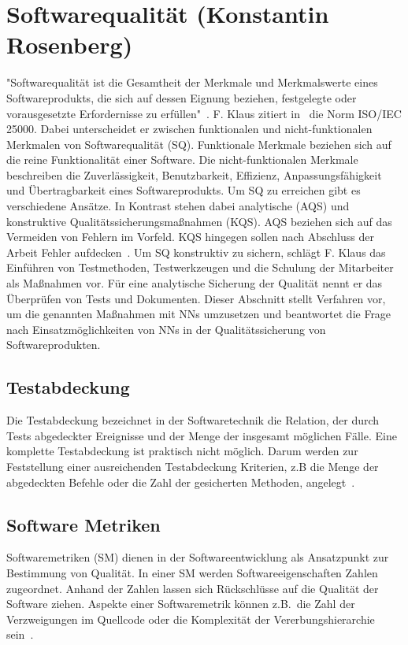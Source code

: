 \section{Softwarequalität (Konstantin Rosenberg)} \label{SQ}
"Softwarequalität ist die Gesamtheit der Merkmale und Merkmalswerte eines Softwareprodukts, die sich auf dessen Eignung beziehen,
festgelegte oder vorausgesetzte
Erfordernisse zu erfüllen"~\cite[p.~20]{Franz2015}.
F. Klaus zitiert in~\cite[p.~20]{Franz2015} die Norm ISO/IEC 25000. Dabei unterscheidet er zwischen funktionalen und nicht-funktionalen Merkmalen von Softwarequalität (SQ).
Funktionale Merkmale beziehen sich auf die reine Funktionalität einer Software. Die nicht-funktionalen Merkmale beschreiben die Zuverlässigkeit, Benutzbar\-keit, Effizienz, Anpassungsfähigkeit und Übertragbarkeit eines Softwareprodukts.
Um SQ zu erreichen gibt es verschiedene Ansätze. In Kontrast stehen dabei analytische (AQS) und konstruktive Qualitätssicherungsmaßnahmen (KQS). AQS beziehen sich auf das Vermeiden von Fehlern im Vorfeld. KQS hingegen sollen nach Abschluss der Arbeit Fehler aufdecken~\cite[p.~29]{Franz2015}. 
Um SQ konstruktiv zu sichern, schlägt F. Klaus das Einführen von Testmethoden, Testwerkzeugen und die Schulung der Mitarbeiter als Maßnahmen vor. Für eine analytische Sicherung der Qualität nennt er das Überprüfen von Tests und Dokumenten. Dieser Abschnitt stellt Verfahren vor, um die genann\-ten Maßnahmen mit NNs umzusetzen und beantwortet die Frage nach Einsatzmöglichkeiten von NNs in der Qualitätssicherung von Softwareprodukten.

\subsection{Testabdeckung}
Die Testabdeckung bezeichnet in der Softwaretechnik die Relation, der durch Tests abgedeckter Ereignisse und der Menge der insgesamt möglichen Fälle. Eine komplette Testabdeckung ist praktisch nicht möglich. Darum werden zur Feststellung einer ausreichenden Testabdeckung Kriterien, z.B die Menge der abgedeckten Befehle oder die Zahl der gesicherten Methoden, angelegt~\cite{Antinyan2018}.

\subsection{Software Metriken}
Softwaremetriken (SM) dienen in der Softwareentwicklung als Ansatzpunkt zur Bestimmung von Qualität. In einer SM werden Softwareeigenschaften Zahlen zugeordnet. Anhand der Zahlen lassen sich Rückschlüsse auf die Qualität der Software ziehen. Aspekte einer Softwaremetrik können z.B.~die Zahl der Verzweigungen im Quellcode oder die Komplexität der Vererbungs\-hierarchie sein~\cite[p.~3]{Committee1998}.

